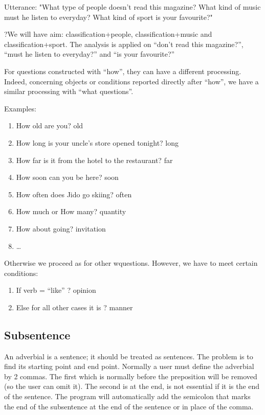 \documentclass[twoside,a4paper,10pt]{report}
\begin{document}
Utterance: "What type of people doesn’t read this magazine? What kind of music must he listen to everyday? What kind of sport is your favourite?"



\small
\begin{verbatimtab}
  ?We will have aim: classification+people, classification+music and classification+sport. The
analysis is applied on “don't read this magazine?”, “must he listen to everyday?” and “is
your favourite?”
\end{verbatimtab}
\normalsize
For questions constructed with “how”, they can have a different processing. Indeed, concerning objects or conditions reported directly after “how”, we have a similar processing with “what questions”. 

Examples:


\begin{enumerate}    \item  How old are you? old
    \item  How long is your uncle's store opened tonight? long
    \item  How far is it from the hotel to the restaurant? far 
    \item  How soon can you be here? soon
    \item  How often does Jido go skiing? often
    \item  How much or How many? quantity
    \item  How about going? invitation
    \item  \ldots{}
\end{enumerate}
Otherwise we proceed as for other w{\textunderscore}questions. However, we have to meet certain conditions:


\begin{enumerate}    \item  If verb = “like” ? opinion
    \item  Else for all other cases it is ? manner
\end{enumerate}

\subsection{Subsentence}
\label{60550ca08c44dda94b3d7a018a352868}%
An adverbial is a sentence; it should be treated as sentences. The problem is to find its starting point and end point.
Normally a user must define the adverbial by 2 commas. The first which is normally before the preposition will be removed (so the user can omit it). The second is at the end, is not essential if it is the end of the sentence. The program will automatically add the semicolon that marks the end of the subsentence at the end of the sentence or in place of the comma. 
\end{document}
